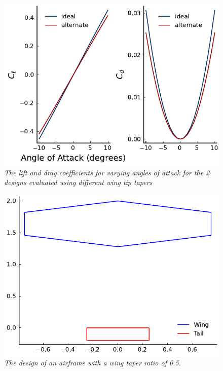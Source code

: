 \documentclass[journal]{new-aiaa}
\begin{document}
	\begin{figure}[H]
		\centering
		\includegraphics{../graphics/taper_coeff.pdf}
		\caption{\emph{The lift and drag coefficients for varying angles of attack for the 2 designs evaluated using different wing tip tapers}}
		\label{fig:taper_coeff}
	\end{figure}
	
	\begin{figure}[H]
		\centering
		\includegraphics{../graphics/taper_design.pdf}
		\caption{\emph{The design of an airframe with a wing taper ratio of 0.5.}}
		\label{fig:taper_design}
	\end{figure}
	
	
	
\end{document}
